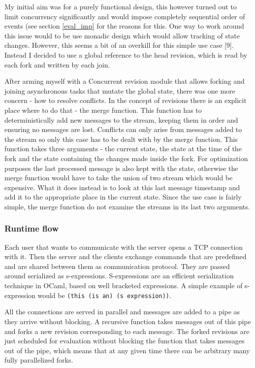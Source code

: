 \documentclass[12pt,twoside,notitlepage]{report}
\begin{document}
{{My initial aim was for a purely functional design, this however turned out to limit concurrency significantly and would impose completely sequential order of events (see section \ref{eval_imp} for the reasons for this}. One way to work around this issue would to be use monadic design which would allow tracking of state changes. However, this seems a bit of an overkill for this simple use case [9]. Instead I decided to use a global reference to the head revision, which is read by each fork and written by each join.

After arming myself with a Concurrent revision module that allows forking and joining asynchronous tasks that mutate the global state, there was one more concern - how to resolve conflicts. In the concept of revisions there is an explicit place where to do that - the merge function. This function has to deterministically add new messages to the stream, keeping them in order and ensuring no messages are lost. Conflicts can only arise from messages added to the stream so only this case has to be dealt with by the merge function. This function takes three arguments - the current state, the state at the time of the fork and the state containing the changes made inside the fork. For optimization purposes the last processed message is also kept with the state, otherwise the merge function would have to take the union of two stream which would be expensive. What it does instead is to look at this last message timestamp and add it to the appropriate place in the current state. Since the use case is fairly simple, the merge function do not examine the streams in its last two arguments.

\subsubsection{Runtime flow}
Each user that wants to communicate with the server opens a TCP connection with it. Then the server and the clients exchange commands that are predefined and are shared between them as communication protocol. They are passed around serialized as s-expressions. S-expressions are an efficient serialization technique in OCaml, based on well bracketed expressions. A simple example of s-expression would be {\tt (this (is an) (s expression))}. 

All the connections are served in parallel and messages are added to a pipe as they arrive without blocking. A recursive function takes messages out of this pipe and forks a new revision corresponding to each message. The forked revisions are just scheduled for evaluation without blocking the function that takes messages out of the pipe, which means that at any given time there can be arbitrary many fully parallelized forks. 

}
\end{document}
